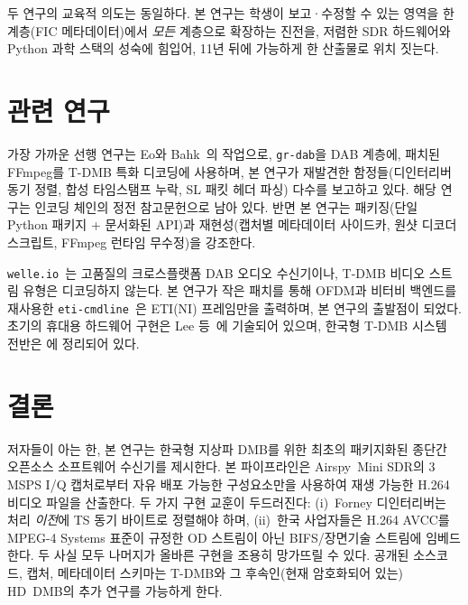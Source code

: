 \documentclass[11pt,a4paper]{article}
\begin{document}
두 연구의 교육적 의도는 동일하다.  본 연구는 학생이 보고·수정할
수 있는 영역을 한 계층(FIC 메타데이터)에서 \emph{모든} 계층으로
확장하는 진전을, 저렴한 SDR 하드웨어와 Python 과학 스택의 성숙에
힘입어, 11년 뒤에 가능하게 한 산출물로 위치 짓는다.

\section{관련 연구}\label{sec:related}

가장 가까운 선행 연구는 Eo와 Bahk~\cite{eo2024tdmb}의 작업으로,
\texttt{gr-dab}을 DAB 계층에, 패치된 FFmpeg를 T-DMB 특화 디코딩에 사용하며,
본 연구가 재발견한 함정들(디인터리버 동기 정렬, 합성 타임스탬프 누락,
SL 패킷 헤더 파싱) 다수를 보고하고 있다.  해당 연구는 인코딩 체인의 정전
참고문헌으로 남아 있다.  반면 본 연구는 패키징(단일 Python 패키지 + 문서화된
API)과 재현성(캡처별 메타데이터 사이드카, 원샷 디코더 스크립트, FFmpeg
런타임 무수정)을 강조한다.

\texttt{welle.io}~\cite{welleio}는 고품질의 크로스플랫폼 DAB 오디오 수신기이나,
T-DMB 비디오 스트림 유형은 디코딩하지 않는다.  본 연구가 작은 패치를 통해
OFDM과 비터비 백엔드를 재사용한 \texttt{eti-cmdline}~\cite{etistuff}은
ETI(NI) 프레임만을 출력하며, 본 연구의 출발점이 되었다.  초기의 휴대용
하드웨어 구현은 Lee 등~\cite{lee2007portable}에 기술되어 있으며, 한국형
T-DMB 시스템 전반은
\cite{ttak0026,etsi102427,etsi102428,hwang2015simulator,iso14496-1}에 정리되어
있다.

\section{결론}\label{sec:conclusion}

저자들이 아는 한, 본 연구는 한국형 지상파 DMB를 위한 최초의 패키지화된
종단간 오픈소스 소프트웨어 수신기를 제시한다.  본 파이프라인은
Airspy~Mini SDR의 3\,MSPS I/Q 캡처로부터 자유 배포 가능한 구성요소만을
사용하여 재생 가능한 H.264 비디오 파일을 산출한다.  두 가지 구현 교훈이
두드러진다: (i)~Forney 디인터리버는 처리 \emph{이전}에 TS 동기 바이트로
정렬해야 하며, (ii)~한국 사업자들은 H.264 AVCC를 MPEG-4 Systems 표준이
규정한 OD 스트림이 아닌 BIFS/장면기술 스트림에 임베드한다.  두 사실 모두
나머지가 올바른 구현을 조용히 망가뜨릴 수 있다.  공개된 소스코드, 캡처,
메타데이터 스키마는 T-DMB와 그 후속인(현재 암호화되어 있는) HD~DMB의
추가 연구를 가능하게 한다.
\end{document}
